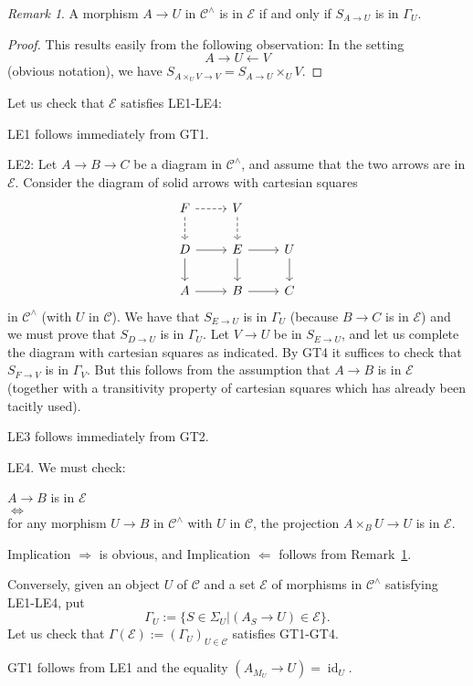 \documentclass[12pt]{article}
\theoremstyle{remark}
\newtheorem{rk}[thm]{Remark}
\theoremstyle{definition}
\newcommand{\nn}{\noindent}
\newcommand{\cc}{\mathcal}
\newcommand{\C}{\mathcal C}
\newcommand{\si}{\Leftarrow}
\newcommand{\then}{\Rightarrow}
\DeclareMathOperator{\id}{id}
\begin{document}
\begin{rk}\label{1613i}
A morphism $A\to U$ in $\C^\wedge$ is in $\cc E$ if and only if $S_{A\to U}$ is in $\Gamma_U$. 
\end{rk}

\begin{proof}
This results easily from the following observation: In the setting 
$$
A\to U\leftarrow V
$$ 
(obvious notation), we have $S_{A\times_UV\to V}=S_{A\to U}\times_UV$. 
\end{proof}

Let us check that $\cc E$ satisfies LE1-LE4:

\nn LE1 follows immediately from GT1.

\nn LE2: Let $A\to B\to C$ be a diagram in $\C^\wedge$, and assume that the two arrows are in $\cc E$. Consider the diagram of solid arrows with cartesian squares 
$$
\begin{tikzcd}
F\ar[dashed]{r}\ar[dashed]{d}&V\ar[dashed]{d}\\ 
D\ar{r}\ar{d}&E\ar{r}\ar{d}&U\ar{d}\\ 
A\ar{r}&B\ar{r}&C
\end{tikzcd}
$$
in $\C^\wedge$ (with $U$ in $\C$). We have that $S_{E\to U}$ is in $\Gamma_U$ (because $B\to C$ is in $\cc E$) and we must prove that $S_{D\to U}$ is in $\Gamma_U$. Let $V\to U$ be in $S_{E\to U}$, and let us complete the diagram with cartesian squares as indicated. By GT4 it suffices to check that $S_{F\to V}$ is in $\Gamma_V$. But this follows from the assumption that $A\to B$ is in $\cc E$ (together with a transitivity property of cartesian squares which has already been tacitly used).

\nn LE3 follows immediately from GT2.

\nn LE4. We must check: 
\begin{center}
$A\to B$ is in $\cc E$\\ $\iff$\\ for any morphism $U\to B$ in $\C^\wedge$ with $U$ in $\C$, the projection $A\times_BU\to U$ is in $\cc E$.
\end{center}
Implication $\then$ is obvious, and Implication $\si$ follows from Remark~\ref{1613i}. 

Conversely, given an object $U$ of $\C$ and a set $\cc E$ of morphisms in $\C^\wedge$ satisfying LE1-LE4, put
$$
\Gamma_U:=\{S\in\Sigma_U|(A_S\to U)\in\cc E\}.
$$
Let us check that $\Gamma(\cc E):=(\Gamma_U)_{U\in\C}$ satisfies GT1-GT4.

GT1 follows from LE1 and the equality $(A_{M_U}\to U)=\id_U$. 
\end{document}
